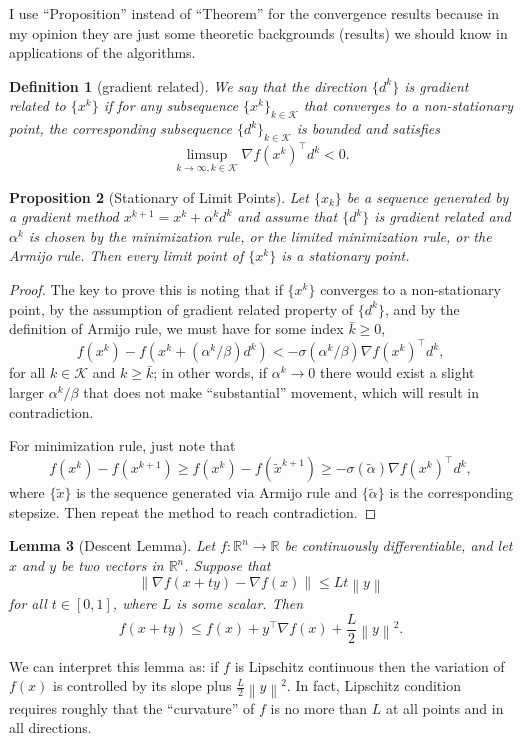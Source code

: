 \documentclass[12pt,a4paper]{report}
\numberwithin{equation}{section}
\theoremstyle{mystyle}
\newtheorem{definition}{Definition}[section]
\newtheorem{lemma}[definition]{Lemma}
\newtheorem{proposition}[definition]{Proposition}
\newcommand{\R}{\mathbb{R}}
\newcommand{\grad}{\nabla}
\newcommand{\T}{\top}
\newcommand{\norm}[1]{\left\lVert #1 \right\rVert}
\begin{document}
	I use ``Proposition'' instead of ``Theorem'' for the convergence results because in my opinion they are just some theoretic backgrounds (results) we should know in applications of the algorithms.
	
	\begin{definition}[gradient related]
		We say that the direction $\{d^k\}$ is \emph{gradient related} to $\{x^k\}$ if for any subsequence $\{x^k\}_{k\in \mathcal{K}}$ that converges to a non-stationary point, the corresponding subsequence $\{d^k\}_{k\in \mathcal{K}}$ is bounded and satisfies
		\begin{equation}
			\limsup_{k\to\infty,k\in \mathcal{K}}\grad f(x^k)^\T d^k<0.
		\end{equation}
	\end{definition}
	
	\begin{proposition}[Stationary of Limit Points]
		Let $\{x_k\}$ be a sequence generated by a gradient method $x^{k+1}=x^k + \alpha^k d^k$ and assume that $\{d^k\}$ is gradient related and $\alpha^k$ is chosen by the minimization rule, or the limited minimization rule, or the Armijo rule. Then every limit point of $\{x^k\}$ is a stationary point.
	\end{proposition}
	\begin{proof}
		The key to prove this is noting that if $\{x^k\}$ converges to a non-stationary point, by the assumption of gradient related property of $\{d^k\}$, and by the definition of Armijo rule, we must have for some index $\bar{k}\geq 0$,
		$$
		f(x^k)-f(x^k+(\alpha^k/\beta)d^k)<-\sigma(\alpha^k/\beta)\grad f(x^k)^\T d^k,
		$$
		for all $k\in \mathcal{K}$ and $k\geq \bar{k}$; in other words, if $\alpha^k\to 0$ there would exist a slight larger $\alpha^k/\beta$ that does not make ``substantial'' movement, which will result in contradiction.
	
		For minimization rule, just note that
		$$
		f(x^k)-f(x^{k+1})\geq f(x^k)-f(\tilde{x}^{k+1})\geq -\sigma(\tilde{\alpha})\grad f(x^k)^\T d^k,
		$$
		where $\{\tilde{x}\}$ is the sequence generated via Armijo rule and $\{\tilde{\alpha}\}$ is the corresponding stepsize. Then repeat the method to reach contradiction.
	\end{proof}

	\begin{lemma}[Descent Lemma]
		Let $f:\R^n \to \R$ be continuously differentiable, and let $x$ and $y$ be two vectors in $\R^n$. Suppose that
		$$
		\norm{\grad f(x+ty)-\grad f(x)}\leq L t \norm{y}
		$$
		for all $t\in [0,1]$, where $L$ is some scalar. Then
		$$
		f(x+ty)\leq f(x)+y^\T \grad f(x) +\frac{L}{2}\norm{y}^2.
		$$
	\end{lemma}
	We can interpret this lemma as: if $f$ is Lipschitz continuous then the variation of $f(x)$ is controlled by its slope plus $\frac{L}{2}\norm{y}^2$. In fact, Lipschitz condition requires roughly that the ``curvature'' of $f$ is no more than $L$ at all points and in all directions.
	
\end{document}

